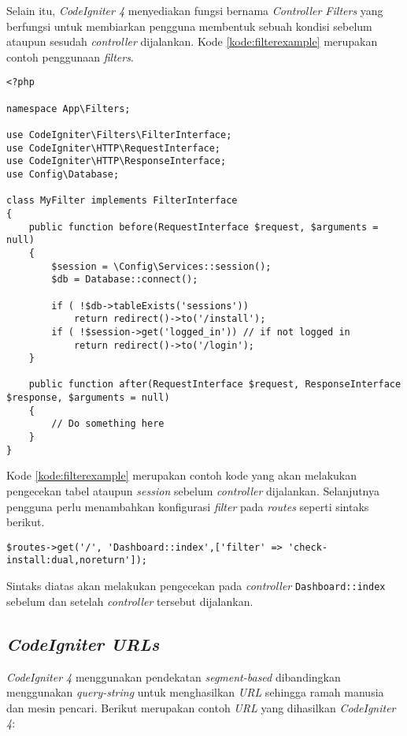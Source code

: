 Selain itu, \textit{CodeIgniter 4} menyediakan fungsi bernama \textit{Controller Filters} yang berfungsi untuk membiarkan pengguna membentuk sebuah kondisi sebelum ataupun sesudah \textit{controller} dijalankan. Kode \ref{kode:filterexample} merupakan contoh penggunaan \textit{filters}.

\begin{lstlisting}[caption=Contoh \textit{Controllers Filters} pada \textit{CodeIgniter 4},label=kode:filterexample]
<?php

namespace App\Filters;

use CodeIgniter\Filters\FilterInterface;
use CodeIgniter\HTTP\RequestInterface;
use CodeIgniter\HTTP\ResponseInterface;
use Config\Database;

class MyFilter implements FilterInterface
{
    public function before(RequestInterface $request, $arguments = null)
    {
        $session = \Config\Services::session();
        $db = Database::connect();

        if ( !$db->tableExists('sessions'))
			return redirect()->to('/install');
		if ( !$session->get('logged_in')) // if not logged in
			return redirect()->to('/login');
    }

    public function after(RequestInterface $request, ResponseInterface $response, $arguments = null)
    {
        // Do something here
    }
}
\end{lstlisting}

Kode \ref{kode:filterexample} merupakan contoh kode yang akan melakukan pengecekan tabel ataupun \textit{session} sebelum \textit{controller} dijalankan. Selanjutnya pengguna perlu menambahkan konfigurasi \textit{filter } pada \textit{routes} seperti sintaks berikut.
\begin{center}
	\verb|$routes->get('/', 'Dashboard::index',['filter' => 'check-install:dual,noreturn']);|
\end{center}

Sintaks diatas akan melakukan pengecekan pada \textit{controller} \texttt{Dashboard::index} sebelum dan setelah \textit{controller} tersebut dijalankan.

\subsection{\textit{CodeIgniter URLs}}
\textit{CodeIgniter 4} menggunakan pendekatan \textit{segment-based} dibandingkan menggunakan \textit{query-string} untuk menghasilkan \textit{URL} sehingga ramah manusia dan mesin pencari. Berikut merupakan contoh \textit{URL} yang dihasilkan \textit{CodeIgniter 4}:

